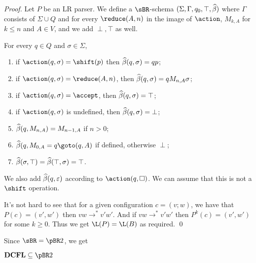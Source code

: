 \documentclass{llncs}
\begin{document}
\begin{proof}

    Let $P$ be an LR parser.
    We define a $\sBR$-schema $(\Sigma,\Gamma,q_0,\top,\widehat\beta)$ where $\Gamma$ consists of $\Sigma\cup Q$ and for every
    $\reduce(A,n)$ in the image of $\action$, $M_{k,A}$ for $k\leq n$ and $A\in V$, and we add $\perp,\top$ as well.

    For every $q\in Q$ and $\sigma\in\Sigma$,
    \begin{enumerate}
        \item if $\action(q,\sigma)=\shift(p)$ then $\widehat\beta(q,\sigma)=qp$;
        \item if $\action(q,\sigma)=\reduce(A,n)$, then $\widehat\beta(q,\sigma)=qM_{n,A}\sigma$;
        \item if $\action(q,\sigma)=\accept$, then $\widehat\beta(q,\sigma)=\top$;
        \item if $\action(q,\sigma)$ is undefined, then $\widehat\beta(q,\sigma)=\bot$;
        \item $\widehat\beta(q,M_{n,A})=M_{n-1,A}$ if $n>0$;
        \item $\hb(q,M_{0,A}=q\goto(q,A)$ if defined, otherwise $\perp$;
        \item $\widehat\beta(\sigma,\top)=\widehat\beta(\top,\sigma)=\top$.
    \end{enumerate}
    We also add $\widehat\beta(q,\varepsilon)$ according to $\action(q,\square)$.
    We can assume that this is not a $\shift$ operation.

    It's not hard to see that for a given configuration $c=(v;w)$, we have that $P(c)=(v',w')$ then $vw\to^* v'w'$.
    And if $vw\to^*v'w'$ then $P^k(c)=(v',w')$ for some $k\geq0$.
    Thus we get $\L(P)=\L(B)$ as required.
    \qed

\end{proof}

Since $\sBR=\pBR2$, we get

\begin{lemma}

    $\DCFL\subseteq\pBR2$

\end{lemma}
\end{document}

